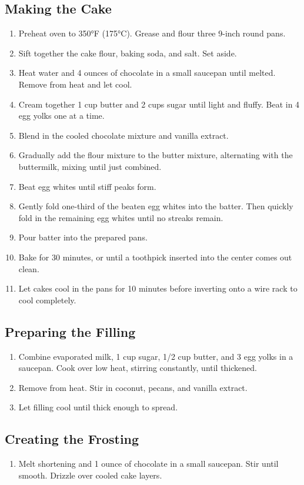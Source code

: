 \documentclass[10pt]{article}
\begin{document}
\begin{paracol}{2}
\subsection*{Making the Cake}
\begin{enumerate}[leftmargin=*]
\item Preheat oven to 350°F (175°C). Grease and flour three 9-inch round pans.
\item Sift together the cake flour, baking soda, and salt. Set aside.
\item Heat water and 4 ounces of chocolate in a small saucepan until melted. Remove from heat and let cool.
\item Cream together 1 cup butter and 2 cups sugar until light and fluffy. Beat in 4 egg yolks one at a time.
\item Blend in the cooled chocolate mixture and vanilla extract.
\item Gradually add the flour mixture to the butter mixture, alternating with the buttermilk, mixing until just combined.
\item Beat egg whites until stiff peaks form.
\item Gently fold one-third of the beaten egg whites into the batter. Then quickly fold in the remaining egg whites until no streaks remain.
\item Pour batter into the prepared pans.
\item Bake for 30 minutes, or until a toothpick inserted into the center comes out clean.
\item Let cakes cool in the pans for 10 minutes before inverting onto a wire rack to cool completely.
\end{enumerate}
\subsection*{Preparing the Filling}
\begin{enumerate}[leftmargin=*]
\item Combine evaporated milk, 1 cup sugar, 1/2 cup butter, and 3 egg yolks in a saucepan. Cook over low heat, stirring constantly, until thickened.
\item Remove from heat. Stir in coconut, pecans, and vanilla extract.
\item Let filling cool until thick enough to spread.
\end{enumerate}
\subsection*{Creating the Frosting}
\begin{enumerate}[leftmargin=*]
\item Melt shortening and 1 ounce of chocolate in a small saucepan. Stir until smooth. Drizzle over cooled cake layers.
\end{enumerate}
\end{paracol}
\end{document}
